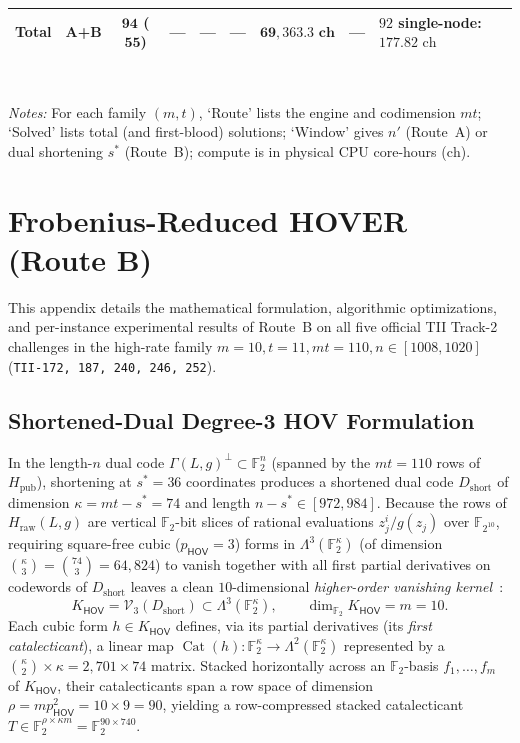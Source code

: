 \documentclass[11pt,a4paper]{article}
\theoremstyle{definition}
\theoremstyle{remark}
\newcommand{\F}{\mathbb{F}}
\newcommand{\Cat}{\operatorname{Cat}}
\newcommand{\HOV}{\mathsf{HOV}}
\begin{document}
\begin{table}[t]
{{\begin{tabular}{@{}cccccccc>{\raggedright\arraybackslash}p{3.45cm}@{}}
\midrule
\textbf{Total} & \textbf{A+B} & $\mathbf{94}$ ($\mathbf{55}$) & --- & --- & --- & $\mathbf{69{,}363.3\text{ ch}}$ & --- & \textbf{$92$ single-node: $177.82\text{ ch}$} \\
\bottomrule
\end{tabular}}
\\[0.35em]
\parbox{\textwidth}{\footnotesize
\emph{Notes:} For each family $(m, t)$, `Route' lists the engine and codimension $mt$; `Solved' lists total (and first-blood) solutions; `Window' gives $n'$ (Route~A) or dual shortening $s^*$ (Route~B); compute is in physical CPU core-hours ($\text{ch}$).}}
\end{table}

\appendix

\section{Frobenius-Reduced HOVER (Route B)}
\label{app:route-b}

This appendix details the mathematical formulation, algorithmic optimizations, and per-instance experimental results of Route~B on all five official TII Track-2 challenges in the high-rate family $m = 10, t = 11, mt = 110, n \in [1008, 1020]$ (\texttt{TII-172, 187, 240, 246, 252}).

\subsection{Shortened-Dual Degree-3 HOV Formulation}
In the length-$n$ dual code $\Gamma(L, g)^\perp \subset \F_2^n$ (spanned by the $mt = 110$ rows of $H_{\text{pub}}$), shortening at $s^* = 36$ coordinates produces a shortened dual code $D_{\text{short}}$ of dimension $\kappa = mt - s^* = 74$ and length $n - s^* \in [972, 984]$. Because the rows of $H_{\text{raw}}(L, g)$ are vertical $\F_2$-bit slices of rational evaluations $z_j^i / g(z_j)$ over $\F_{2^{10}}$, requiring square-free cubic ($p_{\HOV} = 3$) forms in $\Lambda^3(\F_2^\kappa)$ (of dimension $\binom{\kappa}{3} = \binom{74}{3} = 64{,}824$) to vanish together with all first partial derivatives on codewords of $D_{\text{short}}$ leaves a clean $10$-dimensional \emph{higher-order vanishing kernel}~\cite{HW26,Hem26,Saa26a}:
\begin{equation}
\label{eq:app-khov}
    K_{\HOV} = \mathcal{V}_3(D_{\text{short}}) \subset \Lambda^3(\F_2^\kappa),
    \qquad \dim_{\F_2} K_{\HOV} = m = 10.
\end{equation}
Each cubic form $h \in K_{\HOV}$ defines, via its partial derivatives (its \emph{first catalecticant}), a linear map $\Cat(h): \F_2^\kappa \to \Lambda^2(\F_2^\kappa)$ represented by a $\binom{\kappa}{2} \times \kappa = 2{,}701 \times 74$ matrix. Stacked horizontally across an $\F_2$-basis $f_1, \dots, f_m$ of $K_{\HOV}$, their catalecticants span a row space of dimension $\rho = m p_{\HOV}^2 = 10 \times 9 = 90$, yielding a row-compressed stacked catalecticant $T \in \F_2^{\rho \times \kappa m} = \F_2^{90 \times 740}$.
\end{document}
